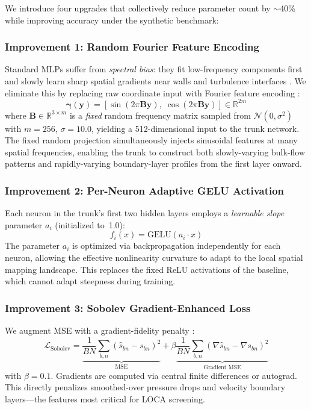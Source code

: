 \documentclass[conference]{IEEEtran}
\begin{document}
We introduce four upgrades that collectively reduce parameter count by $\sim$40\% while improving accuracy under the synthetic benchmark:

\subsubsection{Improvement 1: Random Fourier Feature Encoding}
Standard MLPs suffer from \emph{spectral bias}: they fit low-frequency components first and slowly learn sharp spatial gradients near walls and turbulence interfaces \cite{rahaman2019spectral}. We eliminate this by replacing raw coordinate input with Fourier feature encoding \cite{tancik2020ffn}:
\begin{equation}
\bm{\gamma}(\bm{y}) = \left[\sin(2\pi \bm{B}\bm{y}),\;\cos(2\pi \bm{B}\bm{y})\right] \in \mathbb{R}^{2m}
\label{eq:fourier}
\end{equation}
where $\bm{B} \in \mathbb{R}^{3 \times m}$ is a \emph{fixed} random frequency matrix sampled from $\mathcal{N}(0, \sigma^2)$ with $m = 256$, $\sigma = 10.0$, yielding a 512-dimensional input to the trunk network. The fixed random projection simultaneously injects sinusoidal features at many spatial frequencies, enabling the trunk to construct both slowly-varying bulk-flow patterns and rapidly-varying boundary-layer profiles from the first layer onward.

\subsubsection{Improvement 2: Per-Neuron Adaptive GELU Activation}
Each neuron in the trunk's first two hidden layers employs a \emph{learnable slope} parameter $a_i$ (initialized to~1.0):
\begin{equation}
f_i(x) = \text{GELU}(a_i \cdot x)
\label{eq:adaptive_gelu}
\end{equation}
The parameter $a_i$ is optimized via backpropagation independently for each neuron, allowing the effective nonlinearity curvature to adapt to the local spatial mapping landscape. This replaces the fixed ReLU activations of the baseline, which cannot adapt steepness during training.

\subsubsection{Improvement 3: Sobolev Gradient-Enhanced Loss}
We augment MSE with a gradient-fidelity penalty \cite{son2021sobolev}:
\begin{equation}
\mathcal{L}_\text{Sobolev} = \underbrace{\frac{1}{BN}\sum_{b,n}(\hat{s}_{bn} - s_{bn})^2}_{\text{MSE}} + \beta \underbrace{\frac{1}{BN}\sum_{b,n}(\nabla\hat{s}_{bn} - \nabla s_{bn})^2}_{\text{Gradient MSE}}
\label{eq:sobolev}
\end{equation}
with $\beta = 0.1$. Gradients are computed via central finite differences or autograd. This directly penalizes smoothed-over pressure drops and velocity boundary layers---the features most critical for LOCA screening.
\end{document}
